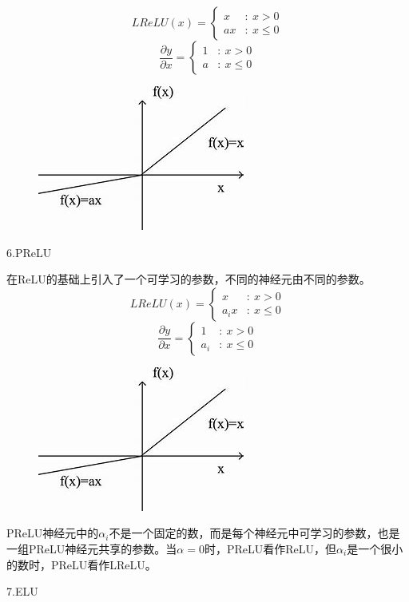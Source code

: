 \documentclass[openbib]{article}
\begin{document}
$$LReLU(x)= \left\{ \begin{array}{cl}
	x & : \ x > 0 \\
	ax & : \ x \le  0
\end{array} \right.$$
$$\frac{\partial y}{\partial x}=\left\{ \begin{array}{cl}
	1 & : \ x > 0 \\
	a & : \ x \le  0
\end{array} \right.$$
\begin{figure}[htbp]
	\centering
	\includegraphics[scale=0.4]{LReLU}
\end{figure}
\begin{center}
	6.PReLU
\end{center}
在ReLU的基础上引入了一个可学习的参数，不同的神经元由不同的参数。
$$LReLU(x)= \left\{ \begin{array}{cl}
	x & : \ x > 0 \\
	a_ix & : \ x \le  0
\end{array} \right.$$
$$\frac{\partial y}{\partial x}=\left\{ \begin{array}{cl}
	1 & : \ x > 0 \\
	a_i & : \ x \le  0
\end{array} \right.$$
\begin{figure}[htbp]
	\centering
	\includegraphics[scale=0.4]{LReLU}
\end{figure}
PReLU神经元中的$\alpha_i$不是一个固定的数，而是每个神经元中可学习的参数，也是一组PReLU神经元共享的参数。当$\alpha=0$时，PReLU看作ReLU，但$\alpha_i$是一个很小的数时，PReLU看作LReLU。
\begin{center}
	7.ELU
\end{center}
\end{document}
